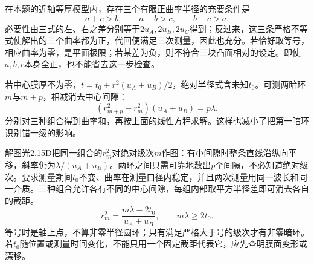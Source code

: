 \documentclass[UTF8,fontset=fandol,a4paper,11pt]{ctexart}
\begin{document}
在本题的近轴等厚模型内，存在三个有限正曲率半径的充要条件是
\[
a+c>b,\qquad a+b>c,\qquad b+c>a.
\]
必要性由三式的左、右之差分别等于$2u_A,2u_B,2u_C$得到；反过来，这三条严格不等式使解出的三个曲率都为正，代回便满足三次测量，因此也充分。若恰好取等号，相应曲率为零，是平面极限；若某差为负，则不符合三块凸面相对的设定。即使$a,b,c$本身全正，也不能省去这一步检查。

若中心膜厚不为零，$t=t_0+r^2(u_A+u_B)/2$，绝对半径式含未知$t_0$。可测两暗环$m$与$m+p$，相减消去中心间隙：
\[
(r_{m+p}^2-r_m^2)(u_A+u_B)=p\lambda.
\]
分别对三种组合得到曲率和，再按上面的线性方程求解。这样也减小了把第一暗环识别错一级的影响。

解图光2.15D把同一组合的$r_m^2$对绝对级次$m$作图：有小间隙时整条直线沿纵向平移，斜率仍为$\lambda/(u_A+u_B)$。两环之间只需可靠地数出$p$个间隔，不必知道绝对级次。要求测量期间$t_0$不变、曲率在测量口径内稳定，并且两次测量用同一波长和同一介质。三种组合允许各有不同的中心间隙，每组内部取平方半径差即可消去各自的截距。
\[
r_m^2=\frac{m\lambda-2t_0}{u_A+u_B},\qquad m\lambda\ge2t_0.
\]
等号时是轴上点，不算非零半径圆环；只有满足严格大于号的级次才有非零暗环。若$t_0$随位置或测量时间变化，不能只用一个固定截距代表它，应先查明膜面变形或漂移。
\end{document}
